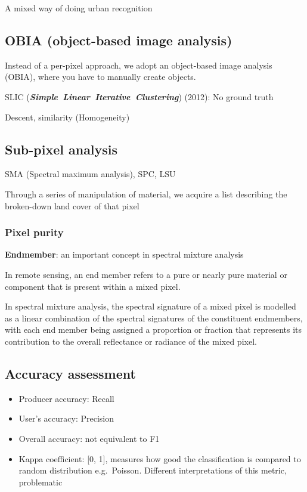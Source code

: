 \documentclass[
  letterpaper,
  DIV=11,
  numbers=noendperiod]{scrreprt}
\begin{document}
A mixed way of doing urban recognition

\hypertarget{obia-object-based-image-analysis}{%
\subsection{OBIA (object-based image
analysis)}\label{obia-object-based-image-analysis}}

Instead of a per-pixel approach, we adopt an object-based image analysis
(OBIA), where you have to manually create objects.

SLIC (\textbf{\emph{Simple~Linear~Iterative~Clustering}}) (2012): No
ground truth

Descent, similarity (Homogeneity)

\hypertarget{sub-pixel-analysis}{%
\subsection{Sub-pixel analysis}\label{sub-pixel-analysis}}

SMA (Spectral maximum analysis), SPC, LSU

Through a series of manipulation of material, we acquire a list
describing the broken-down land cover of that pixel

\hypertarget{pixel-purity}{%
\subsubsection{Pixel purity}\label{pixel-purity}}

\textbf{Endmember}: an important concept in spectral mixture analysis

In remote sensing, an end member refers to a pure or nearly pure
material or component that is present within a mixed pixel.

In spectral mixture analysis, the spectral signature of a mixed pixel is
modelled as a linear combination of the spectral signatures of the
constituent endmembers, with each end member being assigned a proportion
or fraction that represents its contribution to the overall reflectance
or radiance of the mixed pixel.

\hypertarget{accuracy-assessment}{%
\subsection{Accuracy assessment}\label{accuracy-assessment}}

\begin{itemize}
\item
  Producer accuracy: Recall
\item
  User's accuracy: Precision
\item
  Overall accuracy: not equivalent to F1
\item
  Kappa coefficient: {[}0, 1{]}, measures how good the classification is
  compared to random distribution e.g.~Poisson. Different
  interpretations of this metric, problematic
\end{itemize}
\end{document}
